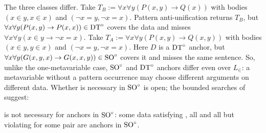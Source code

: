 The three classes differ. Take $T_B:=\forall x\forall y(P(x,y)\to Q(x))$ with bodies $(x\in y,x\in x)$ and
$(\neg x=y,\neg x=x)$. Pattern anti-unification returns $T_B$, but $\forall x\forall y(P(x,y)\to P(x,x))\in\mathrm{DT}^{\circ}$ covers
the data and misses $\forall x\forall y(x\in y\to\neg x=x)$. Take $T_A:=\forall x\forall y(P(x,y)\to Q(x,y))$ with
bodies $(x\in y,y\in x)$ and $(\neg x=y,\neg x=x)$. Here $D$ is a $\mathrm{DT}^{\circ}$ anchor, but $\forall x\forall y(G(x,y,x)\to
G(x,x,y))\in\mathrm{SO}^{\circ}$ covers it and misses the same sentence. So, unlike the one-metavariable case, $\mathrm{SO}^{\circ}$ and $\mathrm{DT}^{\circ}$ anchors
differ even over $L_\in$: a metavariable without a pattern occurrence may choose different arguments on different
data. Whether \zfDroot{} is necessary in $\mathrm{SO}^{\circ}$ is open; the bounded searches of  suggest:

\begin{conjecture}\label{conj:zf:root}
\zfDroot{} is not necessary for anchors in $\mathrm{SO}^{\circ}$: some data satisfying , all  and all 
but violating  for some pair are anchors in $\mathrm{SO}^{\circ}$.
\end{conjecture}

